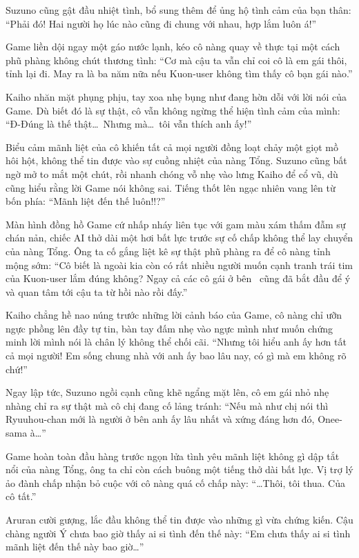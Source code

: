 \documentclass[../main.tex]{subfiles}
\begin{document}
Suzuno cũng gật đầu nhiệt tình, bổ sung thêm để ủng hộ tình cảm của bạn thân: ``Phải đó! Hai người họ lúc nào cũng đi chung với nhau, hợp lắm luôn á!''

Game liền dội ngay một gáo nước lạnh, kéo cô nàng quay về thực tại một cách phũ phàng không chút thương tình: ``Cơ mà cậu ta vẫn chỉ coi cô là em gái thôi, tỉnh lại đi. May ra là ba năm nữa nếu Kuon-user không tìm thấy cô bạn gái nào.''

Kaiho nhăn mặt phụng phịu, tay xoa nhẹ bụng như đang hờn dỗi với lời nói của Game. Dù biết đó là sự thật, cô vẫn không ngừng thể hiện tình cảm của mình: ``Đ-Đúng là thế thật\dots\ Nhưng mà\dots\ tôi vẫn thích anh ấy!''

Biểu cảm mãnh liệt của cô khiến tất cả mọi người đồng loạt chảy một giọt mồ hôi hột, không thể tin được vào sự cuồng nhiệt của nàng Tổng. Suzuno cũng bất ngờ mở to mắt một chút, rồi nhanh chóng vỗ nhẹ vào lưng Kaiho để cổ vũ, dù cũng hiểu rằng lời Game nói không sai. Tiếng thốt lên ngạc nhiên vang lên từ bốn phía: ``Mãnh liệt đến thế luôn!!?''

Màn hình đồng hồ Game cứ nhấp nháy liên tục với gam màu xám thấm đẫm sự chán nản, chiếc AI thở dài một hơi bất lực trước sự cố chấp không thể lay chuyển của nàng Tổng. Ông ta cố gắng liệt kê sự thật phũ phàng ra để cô nàng tỉnh mộng sớm: ``Cô biết là ngoài kia còn có rất nhiều người muốn cạnh tranh trái tim của Kuon-user lắm đúng không? Ngay cả các cô gái ở bên \hll\ cũng đã bắt đầu để ý và quan tâm tới cậu ta từ hồi nào rồi đấy.''

Kaiho chẳng hề nao núng trước những lời cảnh báo của Game, cô nàng chỉ ưỡn ngực phồng lên đầy tự tin, bàn tay đấm nhẹ vào ngực mình như muốn chứng minh lời mình nói là chân lý không thể chối cãi. ``Nhưng tôi hiểu anh ấy hơn tất cả mọi người! Em sống chung nhà với anh ấy bao lâu nay, có gì mà em không rõ chứ!''

Ngay lập tức, Suzuno ngồi cạnh cũng khẽ ngẩng mặt lên, cô em gái nhỏ nhẹ nhàng chỉ ra sự thật mà cô chị đang cố lảng tránh: ``Nếu mà như chị nói thì Ryuuhou-chan mới là người ở bên anh ấy lâu nhất và xứng đáng hơn đó, Onee-sama à\dots''

Game hoàn toàn đầu hàng trước ngọn lửa tình yêu mãnh liệt không gì dập tắt nổi của nàng Tổng, ông ta chỉ còn cách buông một tiếng thở dài bất lực. Vị trợ lý ảo đành chấp nhận bỏ cuộc với cô nàng quá cố chấp này: ``\dots Thôi, tôi thua. Của cô tất.''

Aruran cười gượng, lắc đầu không thể tin được vào những gì vừa chứng kiến. Cậu chàng người Ý chưa bao giờ thấy ai si tình đến thế này: ``Em chưa thấy ai si tình mãnh liệt đến thế này bao giờ\dots''
\end{document}
